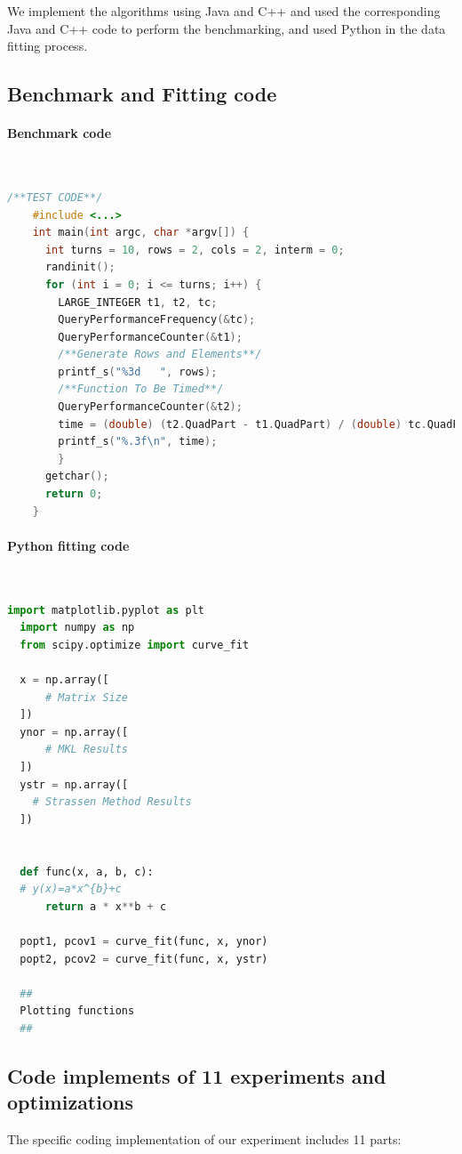 \documentclass[UTF8]{ctexart}
\begin{document}
We implement the algorithms using Java and C++ and used the corresponding Java and C++ code
to perform the benchmarking, and used Python in the data fitting process.

\subsection{Benchmark and Fitting code}
\label{subsec::BFC}

\paragraph{Benchmark code}~{}\\
\begin{lstlisting}[language=C++,style=C++]
  /**TEST CODE**/
    #include <...>
    int main(int argc, char *argv[]) {
      int turns = 10, rows = 2, cols = 2, interm = 0;
      randinit();
      for (int i = 0; i <= turns; i++) {
        LARGE_INTEGER t1, t2, tc;
        QueryPerformanceFrequency(&tc);
        QueryPerformanceCounter(&t1);
        /**Generate Rows and Elements**/
        printf_s("%3d   ", rows);
        /**Function To Be Timed**/
        QueryPerformanceCounter(&t2);
        time = (double) (t2.QuadPart - t1.QuadPart) / (double) tc.QuadPart;
        printf_s("%.3f\n", time);
        }
      getchar();
      return 0;
    }
\end{lstlisting}
\pagebreak
\paragraph{Python fitting code}~{}\\
\begin{lstlisting}[language=Python,style=python]
  import matplotlib.pyplot as plt
  import numpy as np
  from scipy.optimize import curve_fit

  x = np.array([
      # Matrix Size
  ])
  ynor = np.array([
      # MKL Results
  ])
  ystr = np.array([
    # Strassen Method Results
  ])


  def func(x, a, b, c):
  # y(x)=a*x^{b}+c
      return a * x**b + c

  popt1, pcov1 = curve_fit(func, x, ynor)
  popt2, pcov2 = curve_fit(func, x, ystr)

  ##
  Plotting functions
  ##
\end{lstlisting}

\subsection{Code implements of 11 experiments and optimizations}
The specific coding implementation of our experiment includes 11 parts:
\end{document}

